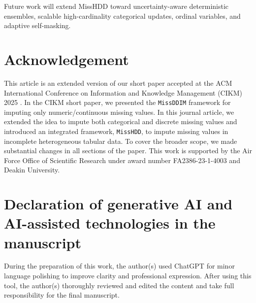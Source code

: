 \documentclass[times, review, 10pt]{elsarticle}
\newcommand{\DIFaddbegin}{\begingroup\color{blue}}
\newcommand{\DIFaddend}{\endgroup}
\begin{document}
Future work will extend MissHDD toward uncertainty-aware deterministic
ensembles, scalable high-cardinality categorical updates, ordinal variables,
and adaptive self-masking.
\DIFaddend



\section*{Acknowledgement}

\DIFaddbegin
This article is an extended version of our short paper accepted at the ACM International Conference on Information and Knowledge Management (CIKM) 2025 \cite{missddim}. In the CIKM short paper, we presented the {\tt MissDDIM} framework for imputing only numeric/continuous missing values. In this journal article, we extended the idea to impute both categorical and discrete missing values and introduced an integrated framework, {\tt MissHDD}, to impute missing values in incomplete heterogeneous tabular data. To cover the broader scope, we made substantial changes in all sections of the paper.
\DIFaddend
This work is supported by the Air Force Office of Scientific Research under award number FA2386-23-1-4003 and Deakin University.

\section*{Declaration of generative AI and AI-assisted technologies in the manuscript}
During the preparation of this work, the author(s) used ChatGPT for minor language polishing to improve clarity and professional expression. After using this tool, the author(s) thoroughly reviewed and edited the content and take full responsibility for the final manuscript.



\end{document}
